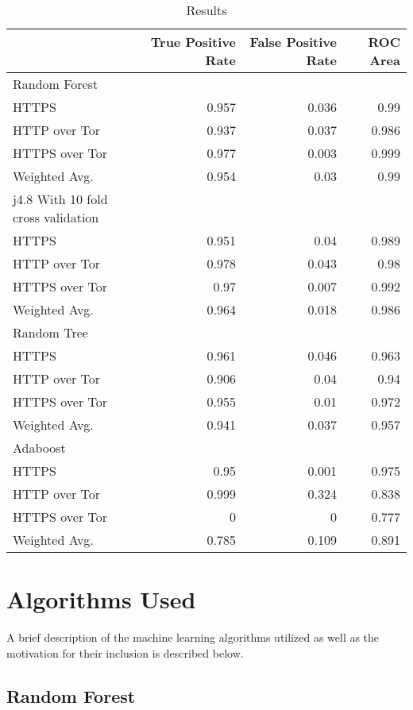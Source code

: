 \begin{table}[H]
  \begin{tabular}{lrrr}
    \toprule
    & True Positive Rate & False Positive Rate & ROC Area \\
    \midrule
    Random Forest\\
    \midrule
    HTTPS & 0.957 & 0.036 & 0.99\\
    HTTP over Tor & 0.937 & 0.037 & 0.986\\
    HTTPS over Tor & 0.977 & 0.003 & 0.999\\
    Weighted Avg. & 0.954 & 0.03 & 0.99\\
    \midrule
    j4.8 With 10 fold cross validation\\
    \midrule
    HTTPS & 0.951 & 0.04 & 0.989\\
    HTTP over Tor & 0.978 & 0.043 & 0.98\\
    HTTPS over Tor & 0.97 & 0.007 & 0.992\\
    Weighted Avg. & 0.964 & 0.018 & 0.986\\
    \midrule
    Random Tree\\
    \midrule
    HTTPS & 0.961 & 0.046 & 0.963\\
    HTTP over Tor & 0.906 & 0.04 & 0.94\\
    HTTPS over Tor & 0.955 & 0.01 & 0.972\\
    Weighted Avg. & 0.941 & 0.037 & 0.957\\
    \midrule
    Adaboost\\
    \midrule
    HTTPS & 0.95 & 0.001 & 0.975\\
    HTTP over Tor & 0.999 & 0.324 & 0.838\\
    HTTPS over Tor & 0 & 0 & 0.777\\
    Weighted Avg. & 0.785 & 0.109 & 0.891\\
    \bottomrule
  \end{tabular}
  \caption{Results}
  \label{table:results}
\end{table}

\section{Algorithms Used}

A brief description of the machine learning algorithms utilized as well as the
motivation for their inclusion is described below.

\subsection{Random Forest}

